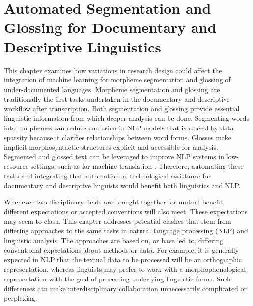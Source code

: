 \chapter{Automated Segmentation and Glossing for Documentary and Descriptive Linguistics}
\label{chap:seggloss}

This chapter examines how variations in research design could affect the integration of machine learning for morpheme segmentation and glossing of under-documented languages. Morpheme segmentation and glossing are traditionally the first tasks undertaken in the documentary and descriptive workflow after transcription. Both segmentation and glossing provide essential linguistic information from which deeper analysis can be done. Segmenting words into morphemes can reduce confusion in NLP models that is caused by data sparsity because it clarifies relationships between word forms. Glosses make implicit morphosyntactic structures explicit and accessible for analysis. Segmented and glossed text can be leveraged to improve NLP systems in low-resource settings, such as for machine translation \citep{shearing_improving_2018,zhou_using_2020}. Therefore, automating these tasks and integrating that automation as technological assistance for documentary and descriptive linguists would benefit both linguistics and NLP.

Whenever two disciplinary fields are brought together for mutual benefit, different expectations or accepted conventions will also meet. These expectations may seem to clash. This chapter addresses potential clashes that stem from differing approaches to the same tasks in natural language processing (NLP) and linguistic analysis. The approaches are based on, or have led to, differing conventional expectations about methods or data. For example, it is generally expected in NLP that the textual data to be processed will be an orthographic representation, whereas linguists may prefer to work with a morphophonological representation with the goal of processing underlying linguistic forms. Such differences can make interdisciplinary collaboration unnecessarily complicated or perplexing. 

